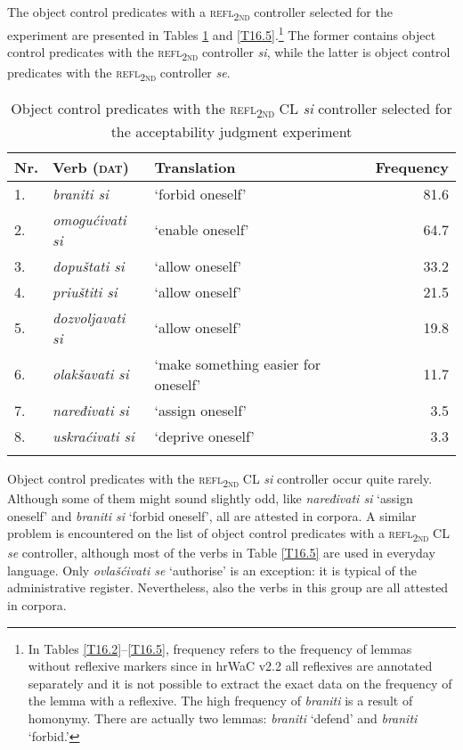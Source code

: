 The object control predicates with a \textsc{refl\textsubscript{2nd}} controller selected for the experiment are presented in Tables \ref{T16.4} and \ref{T16.5}.\footnote{In Tables \ref{T16.2}--\ref{T16.5}, frequency refers to the frequency of lemmas without reflexive markers since in hrWaC v2.2 all reflexives are annotated separately and it is not possible to extract the exact data on the frequency of the lemma with a reflexive. The high frequency of \textit{braniti} is a result of homonymy. There are actually two lemmas: \textit{braniti} ‘defend’ and \textit{braniti} ‘forbid.’} The former contains object control predicates with the \textsc{refl\textsubscript{2nd}} controller \textit{si}, while the latter is object control predicates with the \textsc{refl\textsubscript{2nd}} controller \textit{se}. 

\begin{table}
\caption{Object control predicates with the \textsc{refl\textsubscript{2nd}} CL \textit{si} controller selected for the acceptability judgment experiment\label{T16.4}}
\begin{tabular}{l@{~}llr}
\lsptoprule
Nr.& Verb (\textsc{dat}) &Translation& Frequency\\
\midrule
1. &\textit{braniti si}& ‘forbid oneself’& 81.6 \\
2. &\textit{omogućivati si}&‘enable oneself’& 64.7\\
3. &\textit{dopuštati si}& ‘allow oneself’& 33.2\\
4. &\textit{priuštiti si}& ‘allow oneself’& 21.5\\
5. &\textit{dozvoljavati si}& ‘allow oneself’ &19.8\\
6. &\textit{olakšavati si }&‘make something easier for oneself’& 11.7\\
7. &\textit{naređivati si }&‘assign oneself’ &3.5\\
8. &\textit{uskraćivati si}& ‘deprive oneself’ &3.3\\
\lspbottomrule
\end{tabular}
\end{table}


Object control predicates with the \textsc{refl\textsubscript{2nd}} CL \textit{si} controller occur quite rarely. Although some of them might sound slightly odd, like \textit{naređivati si} ‘assign oneself’ and \textit{braniti si} ‘forbid oneself’, all are attested in corpora. A similar problem is encountered on the list of object control predicates with a \textsc{refl\textsubscript{2nd}} CL \textit{se} controller, although most of the verbs in Table \ref{T16.5} are used in everyday language. Only \textit{ovlašćivati se} ‘authorise’ is an exception: it is typical of the administrative register. Nevertheless, also the verbs in this group are all attested in corpora.

